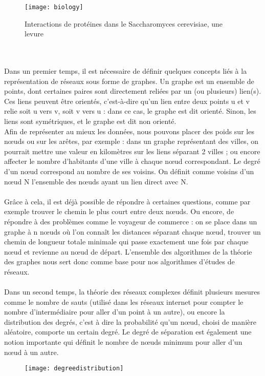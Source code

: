 \begin{titlepage}
{\begin{figure}[h]
\centering
\texttt{[image: biology]}
\caption{Interactions de protéines dans le Saccharomyces cerevisiae, une levure}
\end{figure}
\\ \\
Dans un premier temps, il est nécessaire de définir quelques concepts liés à la représentation de réseaux sous forme de graphes.
Un graphe est un ensemble de points, dont certaines paires sont directement reliées par un (ou plusieurs) lien(s). Ces liens peuvent être orientés, c'est-à-dire qu'un lien entre deux points u et v relie soit u vers v, soit v vers u : dans ce cas, le graphe est dit orienté. Sinon, les liens sont symétriques, et le graphe est dit non orienté. \\ Afin de représenter au mieux les données, nous pouvons placer des poids sur les nœuds ou sur les arêtes, par exemple : dans un graphe représentant des villes, on pourrait mettre une valeur en kilomètres sur les liens séparant 2 villes ; ou encore affecter le nombre d'habitants d'une ville à chaque nœud correspondant. Le degré d'un nœud correspond au nombre de ses voisins. On définit comme voisins d'un nœud N l'ensemble des nœuds ayant un lien direct avec N. 
\\ \\
Grâce à cela, il est déjà possible de répondre à certaines questions, comme par exemple trouver le chemin le plus court entre deux nœuds. Ou encore, de répondre à des problèmes comme le voyageur de commerce : on se place dans un graphe à n nœuds où l'on connaît les distances séparant chaque nœud, trouver un chemin de longueur totale minimale qui passe exactement une fois par chaque nœud et revienne au nœud de départ. L'ensemble des algorithmes de la théorie des graphes nous sert donc comme base pour nos algorithmes d'études de réseaux.
\\ \\ 
Dans un second temps, la théorie des réseaux complexes définit plusieurs mesures comme le nombre de sauts (utilisé dans les réseaux internet pour compter le nombre d'intermédiaire pour aller d'un point à un autre), ou encore la distribution des degrés, c'est à dire la probabilité qu'un nœud, choisi de manière aléatoire, comporte un certain degré. Le degré de séparation est également une notion importante qui définit le nombre de nœuds minimum pour aller d'un nœud à un autre.
\begin{figure}[h]
\centering
\texttt{[image: degreedistribution]}

\end{figure}}
\end{titlepage}
